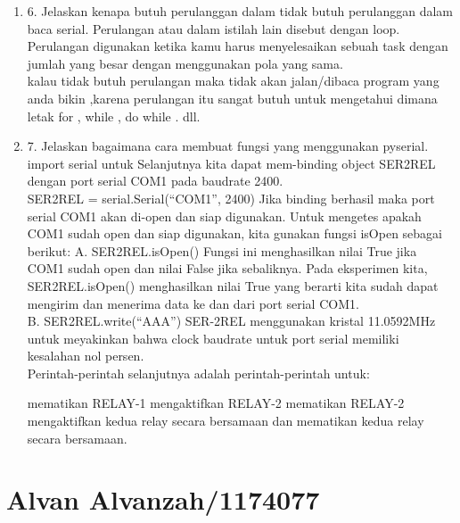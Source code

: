 \begin{enumerate}
\item 6. Jelaskan kenapa butuh perulanggan dalam tidak butuh perulanggan dalam baca serial.
Perulangan atau dalam istilah lain disebut dengan loop. Perulangan digunakan ketika kamu harus menyelesaikan sebuah task dengan jumlah yang besar dengan menggunakan pola yang sama.\\
kalau tidak butuh perulangan maka tidak akan jalan/dibaca program yang anda bikin ,karena perulangan itu sangat butuh untuk mengetahui dimana letak for , while , do while . dll.\\

\item 7. Jelaskan bagaimana cara membuat fungsi yang menggunakan pyserial.
import serial untuk Selanjutnya kita dapat mem-binding object SER2REL dengan port serial COM1 pada baudrate 2400.\\

SER2REL = serial.Serial(“COM1”, 2400)
Jika binding berhasil maka port serial COM1 akan di-open dan siap digunakan. Untuk mengetes apakah COM1 sudah open dan siap digunakan, kita gunakan fungsi isOpen sebagai berikut:
A. SER2REL.isOpen()
Fungsi ini menghasilkan nilai True jika COM1 sudah open dan nilai False jika sebaliknya. Pada eksperimen kita, SER2REL.isOpen() menghasilkan nilai True yang berarti kita sudah dapat mengirim dan menerima data ke dan dari port serial COM1.\\

B. SER2REL.write(“AAA”)
SER-2REL menggunakan kristal 11.0592MHz untuk meyakinkan bahwa clock baudrate untuk port serial memiliki kesalahan nol persen.\\

Perintah-perintah selanjutnya adalah perintah-perintah untuk:

mematikan RELAY-1
mengaktifkan RELAY-2
mematikan RELAY-2
mengaktifkan kedua relay secara bersamaan
dan mematikan kedua relay secara bersamaan.\\

\end{enumerate}
\section{Alvan Alvanzah/1174077}
